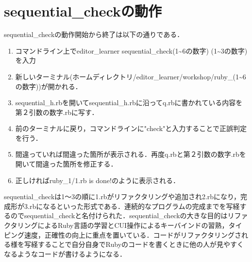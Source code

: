     \section{sequential\_checkの動作}\label{sequential_checkux306eux52d5ux4f5c}

    sequential\_checkの動作開始から終了は以下の通りである．

\begin{enumerate}
\def\labelenumi{\arabic{enumi}.}
\tightlist
\item
  コマンドライン上でeditor\_learner
  sequential\_check(1\textasciitilde{}6の数字)
  (1\textasciitilde{}3の数字)を入力
\item
  新しいターミナル(ホームディレクトリ/editor\_learner/workshop/ruby\_(1\textasciitilde{}6の数字))が開かれる．
\item
  sequential\_h.rbを開いてsequential\_h.rbに沿ってq.rbに書かれている内容を第２引数の数字.rbに写す．
\item
  前のターミナルに戻り，コマンドラインに"check"と入力することで正誤判定を行う．
\item
  間違っていれば間違った箇所が表示される．再度q.rbと第２引数の数字.rbを開いて間違った箇所を修正する．
\item
  正しければruby\_1/1.rb is done!のように表示される．
\end{enumerate}
sequential\_checkは1〜3の順に1.rbがリファクタリングや追加され2.rbになり，完成形が3.rbになるといった形式である．連続的なプログラムの完成までを写経するのでsequential\_checkと名付けられた．sequential\_checkの大きな目的はリファクタリングによるRuby言語の学習とCUI操作によるキーバインドの習熟，タイピング速度，正確性の向上に重点を置いている．コードがリファクタリングされる様を写経することで自分自身でRubyのコードを書くときに他の人が見やすくなるようなコードが書けるようになる．